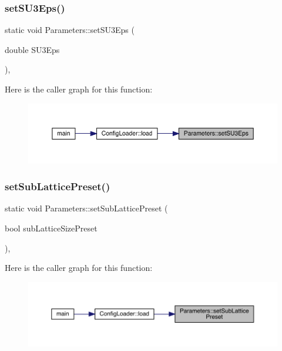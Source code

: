 \subsubsection{\texorpdfstring{setSU3Eps()}{setSU3Eps()}}
{\footnotesize\ttfamily static void Parameters\+::set\+S\+U3\+Eps (\begin{DoxyParamCaption}\item[{double}]{S\+U3\+Eps }\end{DoxyParamCaption})\hspace{0.3cm}{\ttfamily [inline]}, {\ttfamily [static]}}

Here is the caller graph for this function\+:
\nopagebreak
\begin{figure}[H]
\begin{center}
\leavevmode
\includegraphics[width=350pt]{class_parameters_af882fdb68c96c27f1bb99cebe3aecd21_icgraph}
\end{center}
\end{figure}
\mbox{\label{class_parameters_a95d3c7f35ed0421419d98faecb2c23e8}} 
\subsubsection{\texorpdfstring{setSubLatticePreset()}{setSubLatticePreset()}}
{\footnotesize\ttfamily static void Parameters\+::set\+Sub\+Lattice\+Preset (\begin{DoxyParamCaption}\item[{bool}]{sub\+Lattice\+Size\+Preset }\end{DoxyParamCaption})\hspace{0.3cm}{\ttfamily [inline]}, {\ttfamily [static]}}

Here is the caller graph for this function\+:
\nopagebreak
\begin{figure}[H]
\begin{center}
\leavevmode
\includegraphics[width=350pt]{class_parameters_a95d3c7f35ed0421419d98faecb2c23e8_icgraph}
\end{center}
\end{figure}
\mbox{\label{class_parameters_a978f5547036311816f21e3ebe8af77fc}} 
